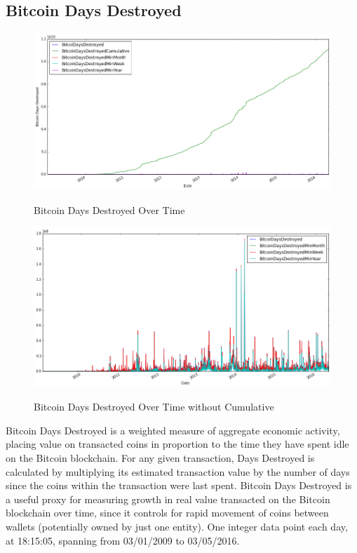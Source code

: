 \clearpage


\subsection{Bitcoin Days Destroyed}
\label{sec:bitcoin-days-destroyed}

\begin{figure}[bth]
  \myfloatalign
  {\includegraphics[width=1\linewidth]
    {gfx/bitcoin-days-destroyed-over-time}}
  \caption{Bitcoin Days Destroyed Over Time}
  \label{fig:bitcoin-days-destroyed-over-time}
\end{figure}

\begin{figure}[bth]
  \myfloatalign
  {\includegraphics[width=1\linewidth]
    {gfx/bitcoin-days-destroyed-over-time-rest}}
  \caption{Bitcoin Days Destroyed Over Time without Cumulative}
  \label{fig:bitcoin-days-destroyed-over-time-rest}
\end{figure}

Bitcoin Days Destroyed is a weighted measure of aggregate economic
activity, placing value on transacted coins in proportion to the time
they have spent idle on the Bitcoin blockchain. For any given
transaction, Days Destroyed is calculated by multiplying its estimated
transaction value by the number of days since the coins within the
transaction were last spent. Bitcoin Days Destroyed is a useful proxy
for measuring growth in real value transacted on the Bitcoin
blockchain over time, since it controls for rapid movement of coins
between wallets (potentially owned by just one entity). One integer
data point each day, at 18:15:05, spanning from 03/01/2009 to
03/05/2016.

